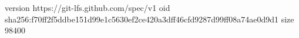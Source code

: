 version https://git-lfs.github.com/spec/v1
oid sha256:f70ff2f5ddbe151d99e1c5630ef2ce420a3dff46cfd9287d99ff08a74ae0d9d1
size 98400
